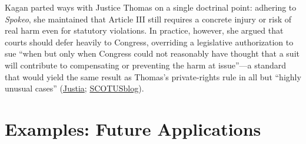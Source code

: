 \documentclass[12pt]{article}
\begin{document}
Kagan parted ways with Justice Thomas on a single doctrinal point: adhering to \textit{Spokeo}, she maintained that Article III still requires a concrete injury or risk of real harm even for statutory violations. In practice, however, she argued that courts should defer heavily to Congress, overriding a legislative authorization to sue ``when but only when Congress could not reasonably have thought that a suit will contribute to compensating or preventing the harm at issue''---a standard that would yield the same result as Thomas's private-rights rule in all but ``highly unusual cases'' (\href{https://supreme.justia.com/cases/federal/us/594/20-297/}{Justia}; \href{https://www.scotusblog.com/2021/06/court-limits-standing-in-credit-reporting-lawsuit/}{SCOTUSblog}).

\section{Examples: Future Applications}
\end{document}

